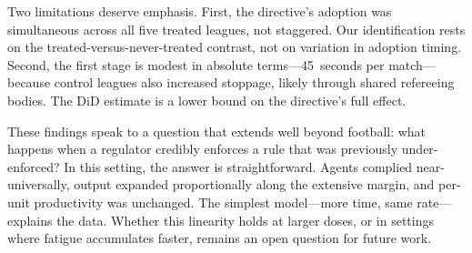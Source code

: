 \medskip

Two limitations deserve emphasis. First, the directive's adoption
was simultaneous across all five treated leagues, not staggered.
Our identification rests on the treated-versus-never-treated
contrast, not on variation in adoption timing. Second, the first
stage is modest in absolute terms---45~seconds per match---because
control leagues also increased stoppage, likely through shared
refereeing bodies. The DiD estimate is a lower bound on the
directive's full effect.

These findings speak to a question that extends well beyond football:
what happens when a regulator credibly enforces a rule that was
previously under-enforced? In this setting, the answer is
straightforward. Agents complied near-universally, output expanded
proportionally along the extensive margin, and per-unit productivity
was unchanged. The simplest model---more time, same rate---explains
the data. Whether this linearity holds at larger doses, or in
settings where fatigue accumulates faster, remains an open question
for future work.
